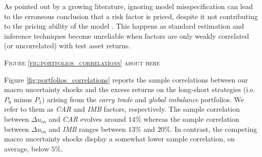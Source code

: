 As pointed out by a growing literature, ignoring model misspecification can lead to the erroneous conclusion that a risk factor is priced, despite it not contributing to the pricing ability of the model \citep[e.g.,][]{KanRobotti:2009, GospodinovKanRobotti:2014, Bryzgalova:2015}. This happens as standard estimation and inference techniques become unreliable when factors are only weakly correlated (or uncorrelated) with test asset returns.

\begin{center}
\textsc{Figure \ref{fig:portfolios_correlations} about here}
\end{center}
Figure \ref{fig:portfolios_correlations} reports the sample correlations between our macro uncertainty shocks and the excess returns on the long-short strategies (i.e. $P_6$ minus $P_1$) arising from the \emph{carry trade} and \emph{global imbalance} portfolios. We refer to them as \emph{CAR} and \emph{IMB} factors, respectively. The sample correlation between $\Delta u_{ca}$ and \emph{CAR} evolves around $14\%$ whereas the sample correlation between $\Delta u_{ca}$ and \emph{IMB} ranges between $13\%$ and $20\%$. In contrast, the competing macro uncertainty shocks display a somewhat lower sample correlation, on average, below $5\%$.

